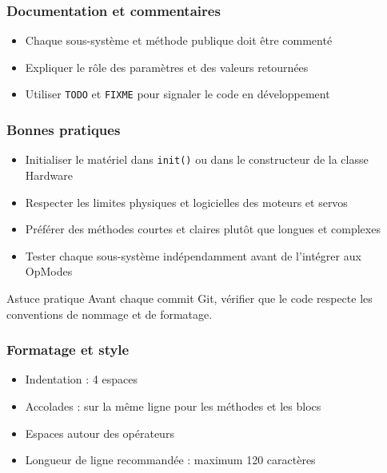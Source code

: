 \documentclass[12pt, a4paper]{report}
\begin{document}
    \subsubsection*{Documentation et commentaires}
    \begin{itemize}
        \item Chaque sous-système et méthode publique doit être commenté
        \item Expliquer le rôle des paramètres et des valeurs retournées
        \item Utiliser \texttt{TODO} et \texttt{FIXME} pour signaler le code en développement
    \end{itemize}

    \subsubsection*{Bonnes pratiques}
    \begin{itemize}
        \item Initialiser le matériel dans \texttt{init()} ou dans le constructeur de la classe Hardware
        \item Respecter les limites physiques et logicielles des moteurs et servos
        \item Préférer des méthodes courtes et claires plutôt que longues et complexes
        \item Tester chaque sous-système indépendamment avant de l’intégrer aux OpModes
    \end{itemize}

    \begin{myinfo}{Astuce pratique}
        Avant chaque commit Git, vérifier que le code respecte les conventions de nommage et de formatage.
    \end{myinfo}

    \subsubsection*{Formatage et style}
    \begin{itemize}
        \item Indentation : 4 espaces
        \item Accolades : sur la même ligne pour les méthodes et les blocs
        \item Espaces autour des opérateurs
        \item Longueur de ligne recommandée : maximum 120 caractères
    \end{itemize}
\end{document}

